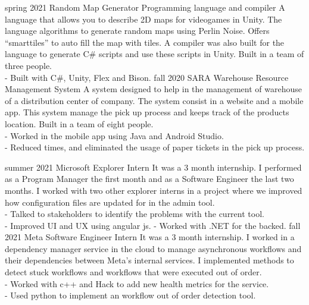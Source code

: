 \documentclass[9pt]{developercv} %
\begin{document}


\begin{entrylist}
	\entry
		{spring 2021}
		{Random Map Generator}
		{Programming language and compiler}
		{A language that allows you to describe 2D maps for videogames in Unity. The language algorithms to generate random maps using Perlin Noise. Offers ``smarttiles'' to auto fill the map with tiles. A compiler was also built for the language to generate C\# scripts and use these scripts in Unity. Built in a team of three people.\\
		- Built with C\#, Unity, Flex and Bison.}
	\entry
		{fall 2020}
		{SARA}
		{Warehouse Resource Management System}
		{A system designed to help in the management of warehouse of a distribution center of company. The system consist in a website and a mobile app. This system manage the pick up process and keeps track of the products location. Built in a team of eight people.\\
		- Worked in the mobile app using Java and Android Studio.\\
		- Reduced times, and eliminated the usage of paper tickets in the pick up process.
		}
\end{entrylist}


\begin{entrylist}
	\entry
		{summer 2021}
		{Microsoft}
		{Explorer Intern}
		{It was a 3 month internship. I performed as a Program Manager the first month and as a Software Engineer the last two months. I worked with two other explorer interns in a project where we improved how configuration files are updated for in the admin tool.\\
		- Talked to stakeholders to identify the problems with the current tool.\\
		- Improved UI and UX using angular js.
		- Worked with .NET for the backed.}
	\entry
		{fall 2021}
		{Meta}
		{Software Engineer Intern}
		{It was a 3 month internship. I worked in a dependency manager service in the cloud to manage asynchronous workflows and their dependencies between Meta's internal services. I implemented methods to detect stuck workflows and workflows that were executed out of order.\\
		- Worked with c++ and Hack to add new health metrics for the service.\\
		- Used python to implement an workflow out of order detection tool.\\
		}
\end{entrylist}
\end{document}
